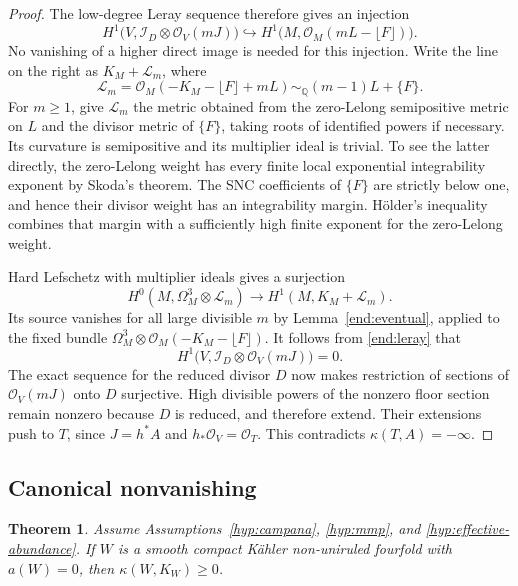 \documentclass[11pt,letterpaper]{article}
\newtheorem{theorem}{Theorem}[section]
\theoremstyle{definition}
\theoremstyle{remark}
\begin{document}
\begin{proof}
The low-degree Leray sequence therefore gives an injection
\begin{equation}\label{end:leray}
 H^1\bigl(V,\mathcal I_D\otimes\mathcal{O}_V(mJ)\bigr)
 \hookrightarrow
 H^1\bigl(M,\mathcal{O}_M(mL-\lfloor F\rfloor)\bigr).
\end{equation}
No vanishing of a higher direct image is needed for this injection.
Write the line on the right as \(K_M+\mathcal L_m\), where
\begin{equation}\label{end:hl-line}
 \mathcal L_m=
 \mathcal{O}_M(-K_M-\lfloor F\rfloor+mL)
 \sim_{\mathbb{Q}}(m-1)L+\{F\}.
\end{equation}
For \(m\ge1\), give \(\mathcal L_m\) the metric obtained from
the zero-Lelong semipositive metric on \(L\) and the divisor metric
of \(\{F\}\), taking roots of identified powers if necessary.
Its curvature is semipositive and its multiplier ideal is trivial.
To see the latter directly, the zero-Lelong weight has every finite
local exponential integrability exponent by Skoda's theorem. The
SNC coefficients of \(\{F\}\) are strictly below one, and hence
their divisor weight has an integrability margin. H\"older's
inequality combines that margin with a sufficiently high finite
exponent for the zero-Lelong weight.

Hard Lefschetz with multiplier ideals
\cite[Theorem~0.1]{DPSHardLefschetz} gives a surjection
\[
 H^0(M,\Omega_M^3\otimes\mathcal L_m)
   \longrightarrow H^1(M,K_M+\mathcal L_m).
\]
Its source vanishes for all large divisible \(m\) by
Lemma~\ref{end:eventual}, applied to the fixed bundle
\(\Omega_M^3\otimes\mathcal{O}_M(-K_M-\lfloor F\rfloor)\).
It follows from \eqref{end:leray} that
\[
 H^1\bigl(V,\mathcal I_D\otimes\mathcal{O}_V(mJ)\bigr)=0.
\]
The exact sequence for the reduced divisor \(D\) now makes
restriction of sections of \(\mathcal{O}_V(mJ)\) onto \(D\)
surjective. High divisible powers of the nonzero floor section
remain nonzero because \(D\) is reduced, and therefore extend.
Their extensions push to \(T\), since \(J=h^*A\) and
\(h_*\mathcal{O}_V=\mathcal{O}_T\). This contradicts
\(\kappa(T,A)=-\infty\).
\end{proof}

\subsection{Canonical nonvanishing}

\begin{theorem}\label{end:canonical}
Assume Assumptions~\ref{hyp:campana}, \ref{hyp:mmp}, and
\ref{hyp:effective-abundance}. If \(W\) is a smooth compact
K\"ahler non-uniruled fourfold with \(a(W)=0\), then
\(\kappa(W,K_W)\ge0\).
\end{theorem}
\end{document}
